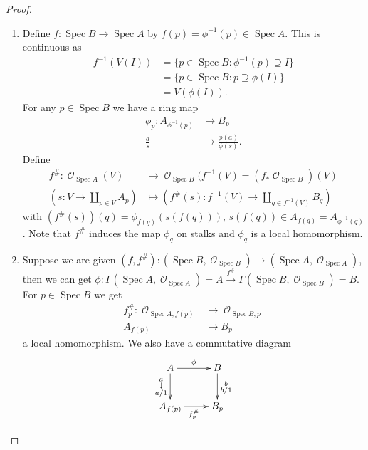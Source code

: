 \documentclass[10pt,]{book}
\theoremstyle{plain}
\theoremstyle{definition}
\numberwithin{equation}{section}
\DeclareMathOperator{\sO}{\mathcal{O}}
\DeclareMathOperator{\Spec}{Spec}
\begin{document}
\begin{proof}
\begin{enumerate}
\item{}
                Define \(f\colon \Spec B \to \Spec A\) by \(f(p) = \phi^{-1}(p) \in \Spec A\).
                This is continuous as
                \begin{align*}
f^{-1}(V(I)) &= \{p\in \Spec B : \phi^{-1}(p) \supseteq I\}\\
             &= \{p\in \Spec B : p \supseteq \phi(I)\}\\
             &= V(\phi(I)).
\end{align*}
                For any \(p\in \Spec B\) we have a ring map 
                \begin{align*}
\phi_p \colon A_{\phi^{-1} (p)} &\to B_p\\
\frac as &\mapsto \frac{\phi(a)}{\phi(s)}.
\end{align*}
                Define
                \begin{align*}
f^\# \colon \sO_{\Spec A}(V) &\to \sO_{\Spec B}(f^{-1}(V) = (f_*\sO_{\Spec B})(V)\\
\left(s\colon V \to \coprod_{p\in V}A_p\right)&\mapsto \left(f^\#(s)\colon f^{-1}(V) \to \coprod_{q\in f^{-1} (V)}B_q\right)
\end{align*}
                with \((f^\#(s))(q) = \phi_{f(q)}(s(f(q)))\), \(s(f(q)) \in A_{f(q)} = A_{\phi^{-1}(q)}\).
                Note that \(f^\#\) induces the map \(\phi_q\) on stalks and \(\phi_q\) is a local homomorphism.
              \item{}
                Suppose we are given \((f, f^\#)\colon (\Spec B, \sO_{\Spec B}) \to (\Spec A, \sO_{\Spec A})\), then we can get \(\phi\colon \Gamma(\Spec A, \sO_{\Spec A}) = A \xrightarrow{f^\#} \Gamma(\Spec B, \sO_{\Spec B}) = B\).
                For \(p\in \Spec B\) we get
                \begin{align*}
f^\#_p \colon \sO_{\Spec A, f(p)} & \to \sO_{\Spec B, p}\\
A_{f(p)} &\to B_p
\end{align*}
                a local homomorphism.
                We also have a commutative diagram
                \[
                  \xymatrix{
                  A \ar[r]^{\phi} \ar[d]_{\substack{a\\\downarrow\\a/1}}& B \ar[d]^{\substack{b\\ b/1}}\\
                  A_{f(p)} \ar[r]_{f_p^\#} & B_p
                  }
                \]
              \end{enumerate}
\end{proof}
\typeout{************************************************}
\typeout{************************************************}
\end{document}
